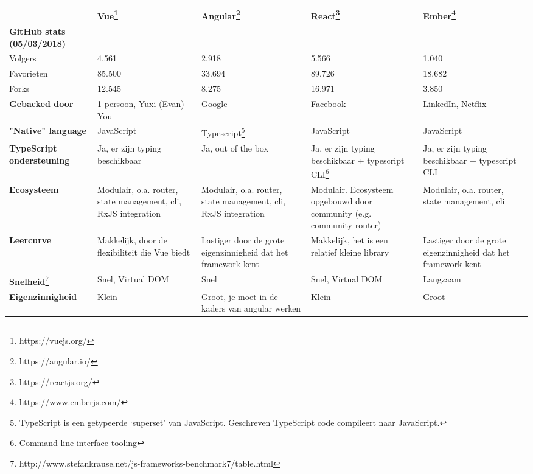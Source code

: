 \begin{table}[htb]
    \centering
    \begin{tabular}{ l | p{2.5cm} p{2.5cm} p{2.5cm} p{2.5cm} }
    & \textbf{Vue}\footnote{https://vuejs.org/} & \textbf{Angular}\footnote{https://angular.io/} & \textbf{React}\footnote{https://reactjs.org/} & \textbf{Ember}\footnote{https://www.emberjs.com/}\\
    \hline
    \textbf{GitHub stats (05/03/2018)} & & &\\
    Volgers & 4.561 & 2.918 & 5.566 & 1.040\\
    Favorieten & 85.500 & 33.694 & 89.726 & 18.682\\
    Forks & 12.545 & 8.275 & 16.971 & 3.850\\
    \textbf{Gebacked door} & 1 persoon, Yuxi (Evan) You &Google & Facebook & LinkedIn, Netflix\\
    \textbf{"Native" language} & JavaScript & Typescript\footnote{TypeScript is een getypeerde ‘superset’ van JavaScript. Geschreven TypeScript code compileert naar JavaScript.} & JavaScript & JavaScript\\
    \textbf{TypeScript ondersteuning} & Ja, er zijn typing beschikbaar &Ja, out of the box & Ja, er zijn typing beschikbaar + typescript CLI\footnote{Command line interface tooling} & Ja, er zijn typing beschikbaar + typescript CLI\\
    \textbf{Ecosysteem} & Modulair, o.a. router, state management, cli, RxJS integration & Modulair, o.a. router, state management, cli, RxJS integration &	Modulair. Ecosysteem opgebouwd door community (e.g. community router) & Modulair, o.a. router, state management, cli\\
    \textbf{Leercurve} & \cellcolor{green!15}Makkelijk, door de flexibiliteit die Vue biedt & \cellcolor{red!25}Lastiger door de grote eigenzinnigheid dat het framework kent & \cellcolor{green!15}Makkelijk, het is een relatief kleine library & \cellcolor{red!25}Lastiger door de grote eigenzinnigheid dat het framework kent\\
    \textbf{Snelheid}\footnote{http://www.stefankrause.net/js-frameworks-benchmark7/table.html} & \cellcolor{green!15}Snel, Virtual DOM & \cellcolor{green!15}Snel & \cellcolor{green!15}Snel, Virtual DOM & \cellcolor{red!25}Langzaam\\
    \textbf{Eigenzinnigheid} & \cellcolor{green!15}Klein & \cellcolor{red!25}Groot, je moet in de kaders van angular werken & \cellcolor{green!15}Klein & \cellcolor{red!25}Groot\\
    \end{tabular}
\end{table}

